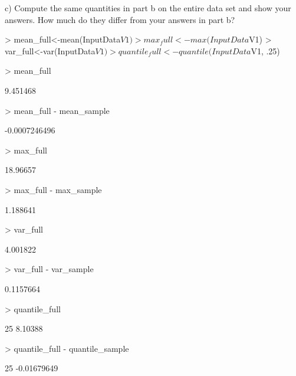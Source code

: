 \documentclass[12pt]{article}
\begin{document}
\newpage
c) Compute the same quantities in part b on the entire data set and show your answers.
How much do they differ from your answers in part b?
\begin{Schunk}
\begin{Sinput}
> mean_full<-mean(InputData$V1)
> max_full<-max(InputData$V1)
> var_full<-var(InputData$V1)
> quantile_full<-quantile(InputData$V1, .25)
\end{Sinput}
\end{Schunk}
\begin{Schunk}
\begin{Sinput}
> mean_full
\end{Sinput}
\begin{Soutput}
[1] 9.451468
\end{Soutput}
\begin{Sinput}
> mean_full - mean_sample
\end{Sinput}
\begin{Soutput}
[1] -0.0007246496
\end{Soutput}
\begin{Sinput}
> max_full
\end{Sinput}
\begin{Soutput}
[1] 18.96657
\end{Soutput}
\begin{Sinput}
> max_full - max_sample
\end{Sinput}
\begin{Soutput}
[1] 1.188641
\end{Soutput}
\begin{Sinput}
> var_full
\end{Sinput}
\begin{Soutput}
[1] 4.001822
\end{Soutput}
\begin{Sinput}
> var_full - var_sample
\end{Sinput}
\begin{Soutput}
[1] 0.1157664
\end{Soutput}
\begin{Sinput}
> quantile_full
\end{Sinput}
\begin{Soutput}
    25% 
8.10388 
\end{Soutput}
\begin{Sinput}
> quantile_full - quantile_sample
\end{Sinput}
\begin{Soutput}
        25% 
-0.01679649 
\end{Soutput}
\end{Schunk}
\end{document}

